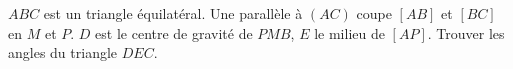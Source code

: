 $ABC$ est un triangle équilatéral. Une parallèle à $(AC)$ coupe $[AB]$ et $[BC]$ en $M$ et $P$. $D$ est le centre de gravité de $PMB$, $E$ le milieu de $[AP]$. Trouver les angles du triangle $DEC$.
